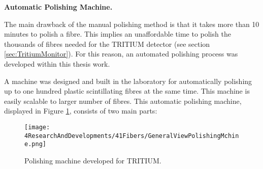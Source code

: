 \textbf{Automatic Polishing Machine.}

The main drawback of the manual polishing method is that it takes more than 10 minutes to polish a fibre. This implies an unaffordable time to polish the thousands of fibres needed for the TRITIUM detector (see section \ref{sec:TritiumMonitor}). For this reason, an automated polishing process was developed within this thesis work. 


A machine was designed and built in the laboratory for automatically polishing up to one hundred plastic scintillating fibres at the same time. This machine is easily scalable to larger number of fibres. This automatic polishing machine, displayed in Figure \ref{fig:GeneralViewPolishingMachine}, consists of two main parts:

\begin{figure}[h]
\centering
\texttt{[image: 4ResearchAndDevelopments/41Fibers/GeneralViewPolishingMchine.png]}
\caption{Polishing machine developed for TRITIUM.\label{fig:GeneralViewPolishingMachine}}
\end{figure}

